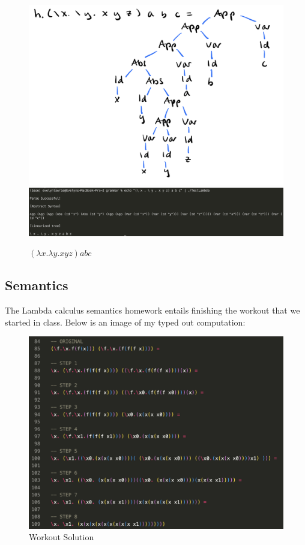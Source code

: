 \documentclass{article}
\theoremstyle{theorem}
\theoremstyle{definition}
\theoremstyle{remark}
\begin{document}
\begin{figure}[H]
\begin{center}
\includegraphics[scale=0.4]{img/hAST.png}
\includegraphics[scale=0.4]{img/ASTh.png}
\end{center}
\caption{$(\lambda x. \lambda y. x y z) a b c$}\label{ASTh}
\end{figure}

\subsection{Semantics}

The Lambda calculus semantics homework entails finishing the workout that we started in class. Below is an image of my typed out computation: 

\begin{figure}[H]
\begin{center}
\includegraphics[scale=0.6]{img/workoutSolution.png}
\end{center}
\caption{Workout Solution}\label{WS}
\end{figure}
\end{document}
